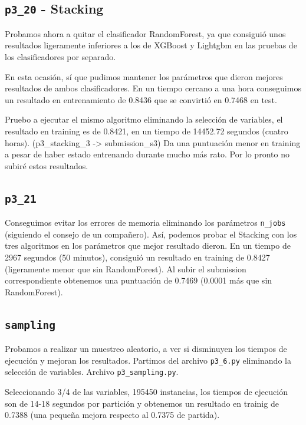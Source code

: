 \documentclass[a4paper, 20pt]{article}
\begin{document}
\subsection{\texttt{p3\_20} - Stacking}

Probamos ahora a quitar el clasificador RandomForest, ya que consiguió unos resultados ligeramente inferiores a los de XGBoost y Lightgbm en las pruebas de los clasificadores por separado.

En esta ocasión, sí que pudimos mantener los parámetros que dieron mejores resultados de ambos clasificadores. En un tiempo cercano a una hora conseguimos un resultado en entrenamiento de 0.8436 que se convirtió en 0.7468 en test.

Pruebo a ejecutar el mismo algoritmo eliminando la selección de variables, el resultado en training es de 0.8421, en un tiempo de 14452.72 segundos (cuatro horas). (p3\_stacking\_3 -> submission\_s3)
Da una puntuación menor en training a pesar de haber estado entrenando durante mucho más rato. Por lo pronto no subiré estos resultados.

\subsection{\texttt{p3\_21}}

Conseguimos evitar los errores de memoria eliminando los parámetros \texttt{n\_jobs} (siguiendo el consejo de un compañero). Así, podemos probar el Stacking con los tres algoritmos en los parámetros que mejor resultado dieron. En un tiempo de 2967 segundos (50 minutos), consiguió un resultado en training de 0.8427 (ligeramente menor que sin RandomForest). Al subir el submission correspondiente obtenemos una puntuación de 0.7469 (0.0001 más que sin RandomForest).

\subsection{\texttt{sampling}}

Probamos a realizar un muestreo aleatorio, a ver si disminuyen los tiempos de ejecución y mejoran los resultados. Partimos del archivo \texttt{p3\_6.py} eliminando la selección de variables. Archivo \texttt{p3\_sampling.py}.

Seleccionando 3/4 de las variables, 195450 instancias, los tiempos de ejecución son de 14-18 segundos por partición y obtenemos un resultado en trainig de 0.7388 (una pequeña mejora respecto al 0.7375 de partida).
\end{document}
